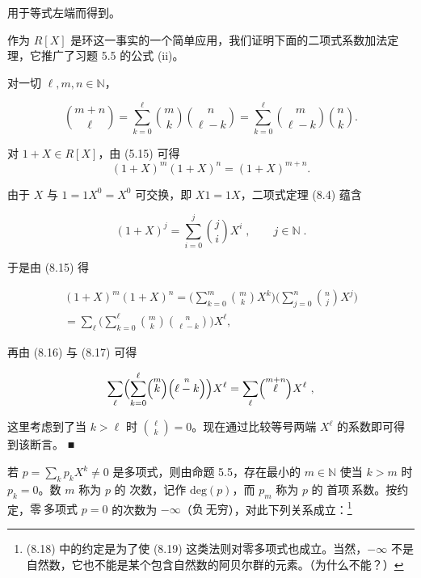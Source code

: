 用于等式左端而得到。

作为  $ R[X] $ 是环这一事实的一个简单应用，我们证明下面的二项式系数加法定理，它推广了习题 5.5 的公式 (ii)。

\begin{proposition}

对一切  $ \ell, m, n \in \mathbb{N} $，

\[
{\binom{m+n}{\ell}}=\sum_{k=0}^{\ell}{\binom{m}{k}}{\binom{n}{\ell-k}}=\sum_{k=0}^{\ell}{\binom{m}{\ell-k}}{\binom{n}{k}}.
\]

\proofhead
对 $1 + X \in R[X]$，由 (5.15) 可得
\begin{equation}
(1+X)^{m}(1+X)^{n}=(1+X)^{m+n}.
\end{equation}

由于 $X$ 与 $1=1X^{0}=X^{0}$ 可交换，即 $X1=1X$，二项式定理 (8.4) 蕴含

\begin{equation}
(1+X)^{j}=\sum_{i=0}^{j}\binom{j}{i}X^{i}\;,\qquad j\in\mathbb{N}\;.
\end{equation}

于是由 (8.15) 得

\begin{equation*}
\begin{aligned}
(1+X)^{m}(1+X)^{n}=\Big(\sum_{k=0}^{m}\binom{m}{k}X^{k}\Big)\Big(\sum_{j=0}^{n}\binom{n}{j}X^{j}\Big)\\=\sum_{\ell}\Big(\sum_{k=0}^{\ell}\binom{m}{k}\binom{n}{\ell-k}\Big)X^{\ell},
\end{aligned}
\end{equation*}

再由 (8.16) 与 (8.17) 可得

\[
\sum_{\ell}\Bigl(\sum_{k=0}^{\ell}\Bigl(\overset{m}{k}\Bigr)\Bigl(\overset{n}{\ell-k}\Bigr)\Bigr)X^{\ell}=\sum_{\ell}\Bigl(\overset{m+n}{\ell}\Bigr)X^{\ell}~,
\]

这里考虑到了当  $ k > \ell $ 时  $ \binom{\ell}{k} = 0 $。现在通过比较等号两端  $ X^{\ell} $ 的系数即可得到该断言。 ■

\end{proposition}

若 $p = \sum_k p_k X^k \neq 0$ 是多项式，则由命题 5.5，存在最小的 $m \in \mathbb{N}$ 使当 $k > m$ 时 $p_k = 0$。数 $m$ 称为 $p$ 的 $\text{次数}$，记作 $\text{deg}(p)$，而 $p_m$ 称为 $p$ 的 $\text{首项}\ \text{系数}$。按约定，$\text{零}\ \text{多项式}$ $p = 0$ 的次数为 $-\infty$（$\text{负}\ \text{无穷}$），对此下列关系成立：\footnote{(8.18) 中的约定是为了使 (8.19) 这类法则对零多项式也成立。当然，$-\infty$ 不是自然数，它也不能是某个包含自然数的阿贝尔群的元素。（为什么不能？）}

